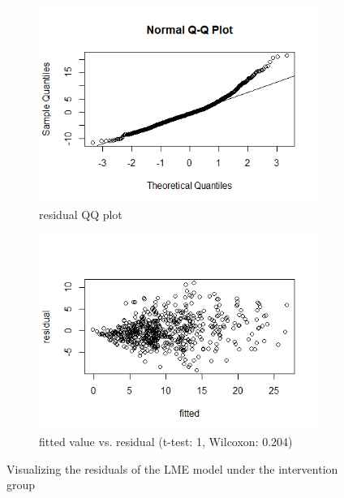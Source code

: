 \begin{figure}[H]
\begin{subfigure}{.5\textwidth}
  \centering
  \includegraphics[width=1\linewidth]{../../plots/qq_residual_treatment.png}
  \caption{residual QQ plot}
\end{subfigure}
\begin{subfigure}{.5\textwidth}
  \centering
  \includegraphics[width=1\linewidth]{../../plots/residual_treatment.png}
  \caption{fitted value vs. residual (t-test: 1, Wilcoxon: 0.204)}
\end{subfigure}
\caption{Visualizing the residuals of the LME model under the intervention group}
\label{fig:residual.treatment}
\end{figure}

